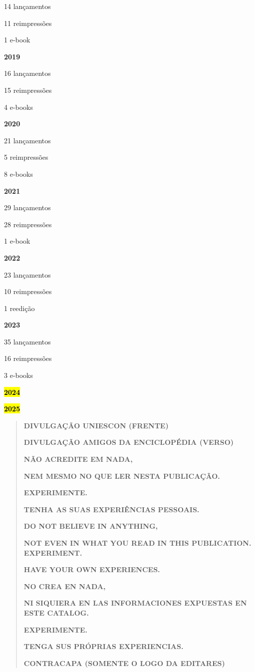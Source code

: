 14 lançamentos

11 reimpressões

1 e-book

\textbf{2019}

16 lançamentos

15 reimpressões

4 e-books

\textbf{2020}

21 lançamentos

5 reimpressões

8 e-books

\textbf{2021}

29 lançamentos

28 reimpressões

1 e-book

\textbf{2022}

23 lançamentos

10 reimpressões

1 reedição

\textbf{2023}

35 lançamentos

16 reimpressões

3 e-books

\textbf{\hl{2024}}

\textbf{\hl{2025}}

\begin{quote}
\textbf{DIVULGAÇÃO UNIESCON (FRENTE)}

\textbf{DIVULGAÇÃO AMIGOS DA ENCICLOPÉDIA (VERSO)}

\textbf{NÃO ACREDITE EM NADA,}

\textbf{NEM MESMO NO QUE LER NESTA PUBLICAÇÃO.}

\textbf{EXPERIMENTE.}

\textbf{TENHA AS SUAS EXPERIÊNCIAS PESSOAIS.}

\textbf{DO NOT BELIEVE IN ANYTHING,}

\textbf{NOT EVEN IN WHAT YOU READ IN THIS PUBLICATION. EXPERIMENT.}

\textbf{HAVE YOUR OWN EXPERIENCES.}

\textbf{NO CREA EN NADA,}

\textbf{NI SIQUIERA EN LAS INFORMACIONES EXPUESTAS EN ESTE CATALOG.}

\textbf{EXPERIMENTE.}

\textbf{TENGA SUS PRÓPRIAS EXPERIENCIAS.}

\textbf{CONTRACAPA (SOMENTE O LOGO DA EDITARES)}
\end{quote}
